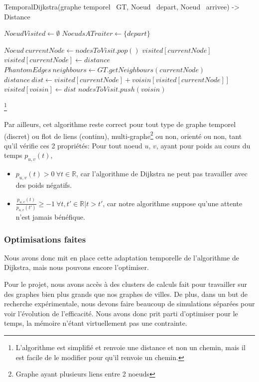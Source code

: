 \begin{algorithm}[H]
    TemporalDijkstra(graphe temporel \ GT, Noeud \ depart, Noeud \ arrivee) -> Distance
\begin{algorithmic}
    \State $NoeudVisited \gets \emptyset$
    \State $NoeudsATraiter \gets \{depart\}$
    
        \State $Noeud \ currentNode \gets nodesToVisit.pop()$
            \State \Return $visited[currentNode]$
        \EndIf
        \State $visited[currentNode] \gets distance$
        \State $PhantomEdges \ neighbours \gets GT.getNeighbours(currentNode)$
            \State $distance \ dist \gets visited[currentNode] + voisin[visited[currentNode]]$
                \State $visited[voisin] \gets dist$
                \State $nodesToVisit.push(voisin)$
            \EndIf
        \EndFor
    \EndWhile
\end{algorithmic}
\end{algorithm}
\footnote{L'algorithme est simplifié et renvoie une distance et non un chemin, mais il est facile de le modifier pour qu'il renvoie un chemin.}

Par ailleurs, cet algorithme reste correct pour tout type de graphe temporel (discret) ou flot de liens (continu), 
multi-graphe\footnote{Graphe ayant plusieurs liens entre 2 noeuds} ou non, 
orienté ou non, tant qu'il vérifie ces 2 propriétés:
Pour tout noeud $u$, $v$, ayant pour poids au cours du temps $p_{u,v}(t)$,
\begin{itemize}
    \item $p_{u,v}(t) > 0 \ \forall t \in \mathbb{R}$, car l'algorithme de Dijkstra ne peut pas travailler avec des poids négatifs.
    \item $\frac{p_{u,v}(t)}{p_{u,v}(t')} \geq -1 \ \forall t, t' \in \mathbb{R} | t > t'$, car notre algorithme suppose qu'une attente n'est jamais bénéfique.
\end{itemize}

\subsubsection{Optimisations faites}

Nous avons donc mit en place cette adaptation temporelle de l'algorithme de Dijkstra, mais nous pouvons encore l'optimiser.

Pour le projet, nous avons accès à des clusters de calculs fait pour travailler sur des graphes bien plus grands que nos graphes de villes.
De plus, dans un but de recherche expérimentale, nous devons faire beaucoup de simulations séparées pour voir l'évolution de l'efficacité.
Nous avons donc prit parti d'optimiser pour le temps, la mémoire n'étant virtuellement pas une contrainte.

